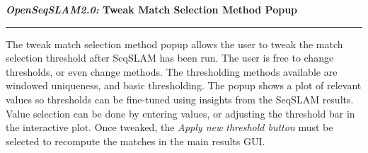\centerline{\textbf{\textit{OpenSeqSLAM2.0:} Tweak Match Selection Method Popup}}
\noindent\rule{\textwidth}{2pt}
\bigskip
\parbox{\textwidth}{The tweak match selection method popup allows the user to tweak the match selection threshold after SeqSLAM has been run. The user is free to change thresholds, or even change methods. The thresholding methods available are windowed uniqueness, and basic thresholding. The popup shows a plot of relevant values so thresholds can be fine-tuned using insights from the SeqSLAM results. Value selection can be done by entering values, or adjusting the threshold bar in the interactive plot. Once tweaked, the \textit{Apply new threshold button} must be selected to recompute the matches in the main results GUI.}
